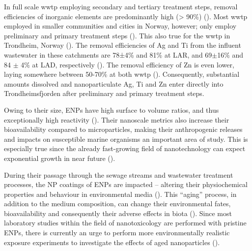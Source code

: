 In full scale \acrshort{wwtp} employing secondary and tertiary treatment steps, removal efficiencies of inorganic elements are predominantly high (> 90\%) (\cite{Cantinho2016}). Most \acrshort{wwtp} employed in smaller communities and cities in Norway, however; only employ preliminary and primary treatment steps (\cite{Berge2018}). This also true for the \acrshort{wwtp} in Trondheim, Norway (\cite{Farkas2020}). The removal efficiencies of \acrshort{Ag} and Ti from the influent wastewater in these catchments are 78±4\% and 81\% at LAR, and 69$\pm$16\% and 84 $\pm$ 4\% at LAD, respectively (\cite{Polesel2018}). The removal efficiency of Zn is even lower, laying somewhere between 50-70\% at both \acrshort{wwtp} (\cite{Farkas2020}). Consequently, substantial amounts dissolved and nanoparticulate \acrshort{Ag}, Ti and Zn enter directly into Trondheimsfjorden after preliminary and primary treatment steps. 

Owing to their size, \acrshort{ENPs} have high surface to volume ratios, and thus exceptionally high reactivity (\cite{Warheit2018}). Their nanoscale metrics also increase their bioavailability compared to microparticles, making their anthropogenic releases and impacts on susceptible marine organisms an important area of study. This is especially true since the already fast-growing field of nanotechnology can expect exponential growth in near future (\cite{Talebian2021}). 

During their passage through the sewage streams and wastewater treatment processes, the NP coatings of \acrshort{ENPs} are impacted – altering their physiochemical properties and behaviour in environmental media (\cite{Kaegi2013}). This “aging” process, in addition to the medium composition, can change their environmental fates, bioavailability and consequently their adverse effects in biota (\cite{Metreveli2016, Georgantzopoulou2020}). Since most laboratory studies within the field of nanotoxicology are performed with pristine \acrshort{ENPs}, there is currently an urge to perform more environmentally realistic exposure experiments to investigate the effects of aged nanoparticles (\cite{Metreveli2016}).



